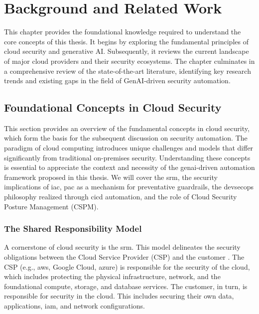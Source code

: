
\chapter{Background and Related Work} %
\label{chap:Background and Related Work}

This chapter provides the foundational knowledge required to understand the core concepts of this thesis. It begins by exploring the fundamental principles of cloud security and generative AI. Subsequently, it reviews the current landscape of major cloud providers and their security ecosystems. The chapter culminates in a comprehensive review of the state-of-the-art literature, identifying key research trends and existing gaps in the field of GenAI-driven security automation.

\section{Foundational Concepts in Cloud Security}
\label{sec:foundational_cloud_security}

This section provides an overview of the fundamental concepts in cloud security, which form the basis for the subsequent discussion on security automation. The paradigm of cloud computing introduces unique challenges and models that differ significantly from traditional on-premises security. Understanding these concepts is essential to appreciate the context and necessity of the \gls{genai}-driven automation framework proposed in this thesis. We will cover the \gls{srm}, the security implications of \gls{iac}, \gls{pac} as a mechanism for preventative guardrails, the \gls{devsecops} philosophy realized through \gls{cicd} automation, and the role of Cloud Security Posture Management (CSPM).

\subsection{The Shared Responsibility Model}
A cornerstone of cloud security is the \gls{srm}. This model delineates the security obligations between the Cloud Service Provider (CSP) and the customer \cite{amazon_web_services_shared_2025}. The CSP (e.g., \gls{aws}, Google Cloud, \gls{azure}) is responsible for the security of the cloud, which includes protecting the physical infrastructure, network, and the foundational compute, storage, and database services. The customer, in turn, is responsible for security in the cloud. This includes securing their own data, applications, \gls{iam}, and network configurations.

